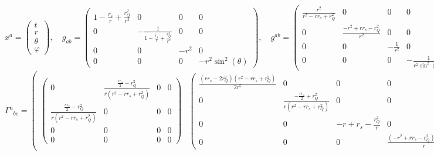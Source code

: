 \documentclass[11pt]{article}
\begin{document}
    $$x^{a}=\begin{pmatrix}t\\r\\\theta\\\varphi\end{pmatrix},\quad g_{ab}=\begin{pmatrix} 1 - \frac{r_{s}}{r} + \frac{r_{Q}^{2}}{r^{2}} & 0 & 0 & 0\\ 0 & - \frac{1}{1 - \frac{r_{s}}{r} + \frac{r_{Q}^{2}}{r^{2}}} & 0 & 0\\ 0 & 0 & - r^{2} & 0\\ 0 & 0 & 0 & - r^{2} \sin^{2}{\left(\theta \right)} \end{pmatrix},\quad g^{ab}=\begin{pmatrix} \frac{r^{2}}{r^{2} - r r_{s} + r_{Q}^{2}} & 0 & 0 & 0\\ 0 & \frac{- r^{2} + r r_{s} - r_{Q}^{2}}{r^{2}} & 0 & 0\\ 0 & 0 & - \frac{1}{r^{2}} & 0\\ 0 & 0 & 0 & - \frac{1}{r^{2} \sin^{2}{\left(\theta \right)}} \end{pmatrix},$$
$${\Gamma^{a}}_{bc}=\begin{pmatrix} \begin{pmatrix} 0 & \frac{\frac{r r_{s}}{2} - r_{Q}^{2}}{r \left(r^{2} - r r_{s} + r_{Q}^{2}\right)} & 0 & 0\\ \frac{\frac{r r_{s}}{2} - r_{Q}^{2}}{r \left(r^{2} - r r_{s} + r_{Q}^{2}\right)} & 0 & 0 & 0\\ 0 & 0 & 0 & 0\\ 0 & 0 & 0 & 0 \end{pmatrix} & \begin{pmatrix} \frac{\left(r r_{s} - 2 r_{Q}^{2}\right) \left(r^{2} - r r_{s} + r_{Q}^{2}\right)}{2 r^{5}} & 0 & 0 & 0\\ 0 & \frac{- \frac{r r_{s}}{2} + r_{Q}^{2}}{r \left(r^{2} - r r_{s} + r_{Q}^{2}\right)} & 0 & 0\\ 0 & 0 & - r + r_{s} - \frac{r_{Q}^{2}}{r} & 0\\ 0 & 0 & 0 & \frac{\left(- r^{2} + r r_{s} - r_{Q}^{2}\right) \sin^{2}{\left(\theta \right)}}{r} \end{pmatrix} & \begin{pmatrix} 0 & 0 & 0 & 0\\ 0 & 0 & \frac{1}{r} & 0\\ 0 & \frac{1}{r} & 0 & 0\\ 0 & 0 & 0 & - \sin{\left(\theta \right)} \cos{\left(\theta \right)} \end{pmatrix} & \begin{pmatrix} 0 & 0 & 0 & 0\\ 0 & 0 & 0 & \frac{1}{r}\\ 0 & 0 & 0 & \frac{1}{\tan{\left(\theta \right)}}\\ 0 & \frac{1}{r} & \frac{1}{\tan{\left(\theta \right)}} & 0 \end{pmatrix} \end{pmatrix},$$
\end{document}
